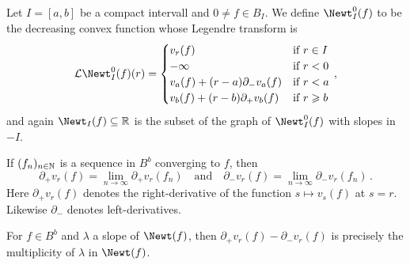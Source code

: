\documentclass[a4paper, 10pt, oneside, DIV=9, chapterprefix=true, numbers=enddot,bibliography=totoc]{scrbook}
\begin{document}
\begin{defi}
	Let $I=[a,b]$ be a compact intervall and $0\neq f\in B_I$. We define $\Newt_I^0(f)$ to be the decreasing convex function whose Legendre transform is
	\begin{equation*}
		\Ll\Newt_I^0(f)(r)=\begin{cases}
		v_r(f) & \text{if }r\in I\\
		-\infty & \text{if }r<0\\
		v_a(f)+(r-a)\partial_-v_a(f) & \text{if }r<a\\
		v_b(f)+(r-b)\partial_+v_b(f) & \text{if }r\geq b
		\end{cases}\,,
	\end{equation*}
	and again $\Newt_I(f)\subseteq \IR$ is the subset of the graph of $\Newt_I^0(f)$ with slopes in $-I$.
\end{defi}
\begin{rem}
	\begin{numerate}
		\item If $(f_n)_{n\in\mathbb{N}}$ is a sequence in $B^b$ converging to $f$, then
		\begin{equation*}
			\partial_+v_r(f)=\lim_{n\to\infty}\partial_+v_r(f_n)\quad\text{and}\quad\partial_-v_r(f)=\lim_{n\to\infty}\partial_-v_r(f_n)\,.
		\end{equation*}
		Here $\partial_+v_r(f)$ denotes the right-derivative of the function $s\mapsto v_s(f)$ at $s=r$. Likewise $\partial_-$ denotes left-derivatives.
		\item For $f\in B^b$ and $\lambda$ a slope of $\Newt(f)$, then $\partial_+v_r(f)-\partial_-v_r(f)$ is precisely the multiplicity of $\lambda$ in $\Newt(f)$.
	\end{numerate}
\end{rem}


\appendix

\backmatter{}
\printbibliography
\end{document}
